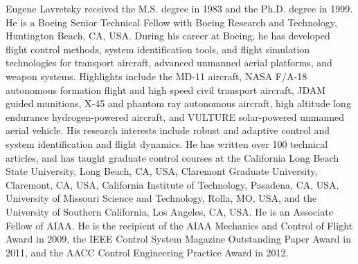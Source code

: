 \documentclass[journal]{IEEEtran}
\newcommand{\figurepath}{../fig/bio}
\begin{document}
\begin{multicols}{2}
    \begin{IEEEbiography}{Eugene Lavretsky}
      received the M.S. degree in 1983 and the Ph.D. degree in 1999.
      He is a Boeing Senior Technical Fellow with Boeing Research and Technology, Huntington Beach, CA, USA.
      During his career at Boeing, he has developed flight control methods, system identification tools, and flight simulation technologies for transport aircraft, advanced unmanned aerial platforms, and weapon systems.
      Highlights include the MD-11 aircraft, NASA F/A-18 autonomous formation flight and high speed civil transport aircraft, JDAM guided munitions, X-45 and phantom ray autonomous aircraft, high altitude long endurance hydrogen-powered aircraft, and VULTURE solar-powered unmanned aerial vehicle.
      His research interests include robust and adaptive control and system identification and flight dynamics.
      He has written over 100 technical articles, and has taught graduate control courses at the California Long Beach State University, Long Beach, CA, USA, Claremont Graduate University, Claremont, CA, USA, California Institute of Technology, Pasadena, CA, USA, University of Missouri Science and Technology, Rolla, MO, USA, and the University of Southern California, Los Angeles, CA, USA.
      He is an Associate Fellow of AIAA.
      He is the recipient of the AIAA Mechanics and Control of Flight Award in 2009, the IEEE Control System Magazine Outstanding Paper Award in 2011, and the AACC Control Engineering Practice Award in 2012.
    \end{IEEEbiography}

  \end{multicols}
\end{document}
